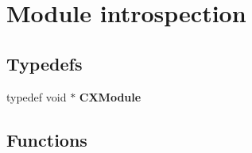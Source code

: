 \hypertarget{group__CINDEX__MODULE}{}\section{Module introspection}
\label{group__CINDEX__MODULE}
\subsection*{Typedefs}
\begin{DoxyCompactItemize}
\item 
\mbox{\label{group__CINDEX__MODULE_ga8b7b9a4a5faa82fdf95aebdfebc5859c}} 
typedef void $\ast$ {\bfseries C\+X\+Module}
\end{DoxyCompactItemize}
\subsection*{Functions}
